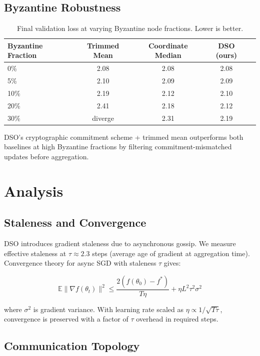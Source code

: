 \documentclass[11pt,a4paper]{article}
\begin{document}
\subsection{Byzantine Robustness}

\begin{table}[H]
\centering
\begin{tabular}{lcccc}
\toprule
\textbf{Byzantine Fraction} & \textbf{Trimmed Mean} & \textbf{Coordinate Median} & \textbf{DSO (ours)} \\
\midrule
0\% & 2.08 & 2.08 & 2.08 \\
5\% & 2.10 & 2.09 & 2.09 \\
10\% & 2.19 & 2.12 & 2.10 \\
20\% & 2.41 & 2.18 & 2.12 \\
30\% & diverge & 2.31 & 2.19 \\
\bottomrule
\end{tabular}
\caption{Final validation loss at varying Byzantine node fractions. Lower is better.}
\end{table}

DSO's cryptographic commitment scheme + trimmed mean outperforms both baselines at
high Byzantine fractions by filtering commitment-mismatched updates before aggregation.

\section{Analysis}

\subsection{Staleness and Convergence}

DSO introduces gradient staleness due to asynchronous gossip. We measure effective
staleness at $\tau \approx 2.3$ steps (average age of gradient at aggregation time).
Convergence theory for async SGD with staleness $\tau$ gives:

\begin{equation}
\mathbb{E}\|\nabla f(\theta_t)\|^2 \leq \frac{2(f(\theta_0) - f^*)}{T\eta} + \eta L^2 \tau^2 \sigma^2
\end{equation}

where $\sigma^2$ is gradient variance. With learning rate scaled as $\eta \propto 1/\sqrt{T\tau}$,
convergence is preserved with a factor of $\tau$ overhead in required steps.

\subsection{Communication Topology}
\end{document}
